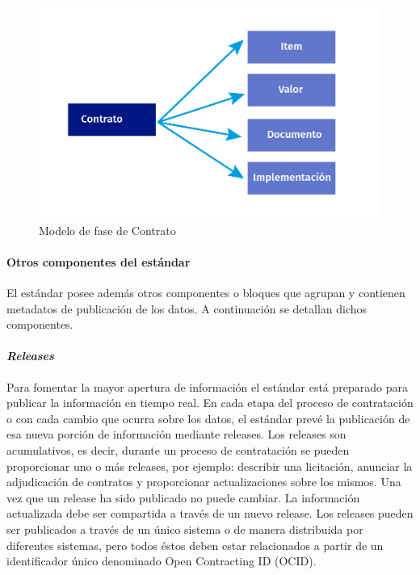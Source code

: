 \begin{figure}[htbp!]
    \centering
    \includegraphics[width=150mm]{figuras/Diagramas_Contrato.png}
    \caption{Modelo de fase de Contrato}
    \label{img:Fase de Contrato}
\end{figure}

\paragraph{Otros componentes del estándar}\hfill \break
El estándar posee además otros componentes o bloques que agrupan y contienen metadatos de publicación de los datos.  A continuación se detallan dichos componentes.

\paragraph{\textit{Releases}}\hfill \break
Para fomentar la mayor apertura de información el estándar está preparado para publicar la información en tiempo real. En cada etapa del proceso de contratación o con cada cambio que ocurra sobre los datos, el estándar prevé la publicación de esa nueva porción de información mediante releases.
Los releases son acumulativos, es decir, durante un proceso de contratación se pueden proporcionar uno o más releases, por ejemplo: describir una licitación, anunciar la adjudicación de contratos y proporcionar actualizaciones sobre los mismos.
Una vez que un release ha sido publicado no puede cambiar. La información actualizada debe ser compartida a través de un nuevo release.
Los releases pueden ser publicados a través de un único sistema o de manera distribuida por diferentes sistemas, pero todos éstos deben estar relacionados a partir de un identificador único denominado Open Contracting ID (OCID).

